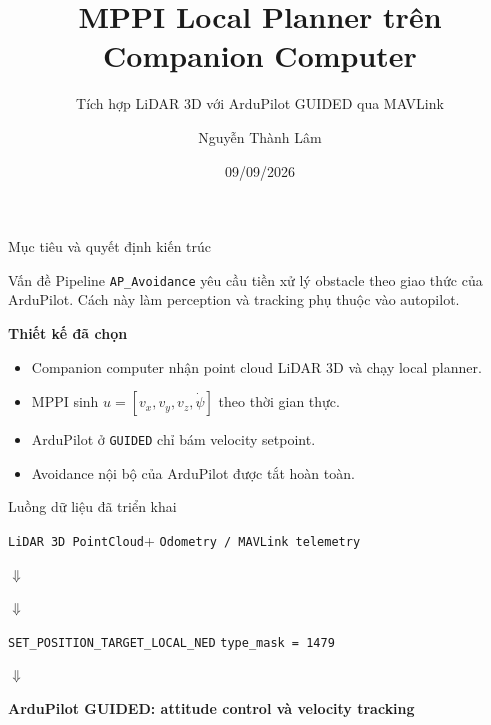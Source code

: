 \documentclass[aspectratio=169,11pt]{beamer}
\title{MPPI Local Planner trên Companion Computer}
\subtitle{Tích hợp LiDAR 3D với ArduPilot GUIDED qua MAVLink}
\author{Nguyễn Thành Lâm}
\institute{Báo cáo tiến độ kỹ thuật}
\date{09/09/2026}
\begin{document}
\begin{frame}
  \titlepage
\end{frame}

\begin{frame}{Mục tiêu và quyết định kiến trúc}
  \begin{block}{Vấn đề}
    Pipeline \texttt{AP\_Avoidance} yêu cầu tiền xử lý obstacle theo giao thức
    của ArduPilot. Cách này làm perception và tracking phụ thuộc vào autopilot.
  \end{block}

  \vspace{0.4em}
  \textbf{Thiết kế đã chọn}
  \begin{itemize}
    \item Companion computer nhận point cloud LiDAR 3D và chạy local planner.
    \item MPPI sinh $u=[v_x,v_y,v_z,\dot\psi]$ theo thời gian thực.
    \item ArduPilot ở \texttt{GUIDED} chỉ bám velocity setpoint.
    \item Avoidance nội bộ của ArduPilot được tắt hoàn toàn.
  \end{itemize}
\end{frame}

\begin{frame}{Luồng dữ liệu đã triển khai}
  \centering
  \begin{minipage}{0.92\textwidth}
    \centering
    \texttt{LiDAR 3D PointCloud}\quad +\quad
    \texttt{Odometry / MAVLink telemetry}

    \vspace{0.7em}
    $\Downarrow$

    \vspace{0.7em}

    \vspace{0.7em}
    $\Downarrow$

    \vspace{0.7em}
    \texttt{SET\_POSITION\_TARGET\_LOCAL\_NED}\quad
    \texttt{type\_mask = 1479}

    \vspace{0.7em}
    $\Downarrow$

    \vspace{0.7em}
    \textbf{ArduPilot GUIDED: attitude control và velocity tracking}
  \end{minipage}
\end{frame}
\end{document}
